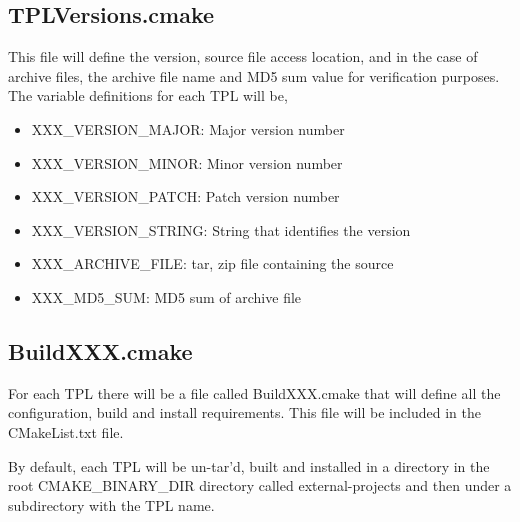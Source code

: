 \documentclass[12pt]{article}
\begin{document}
\subsection{TPLVersions.cmake}
This file will define the version, source file access location, and in the case of archive files, the archive file name and MD5
sum value for verification purposes. The variable definitions for each TPL will be,
\begin{itemize}
\item XXX\_VERSION\_MAJOR: Major version number
\item XXX\_VERSION\_MINOR: Minor version number
\item XXX\_VERSION\_PATCH: Patch version number
\item XXX\_VERSION\_STRING: String that identifies the version
\item XXX\_ARCHIVE\_FILE: tar, zip file containing the source
\item XXX\_MD5\_SUM: MD5 sum of archive file
\end{itemize}

\subsection{BuildXXX.cmake}
For each TPL there will be a file called BuildXXX.cmake that will define all the configuration, build and install
requirements. This file will be included in the CMakeList.txt file.

By default, each TPL will be un-tar'd, built and installed in a directory  in the root CMAKE\_BINARY\_DIR directory
called external-projects and then under a subdirectory with the TPL name.
\end{document}
